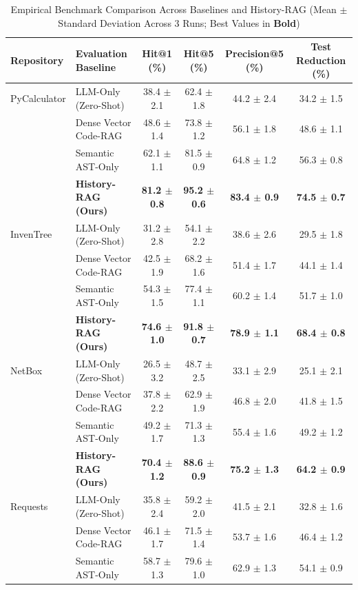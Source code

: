 \documentclass[12pt,onecolumn,draftclsnofoot]{IEEEtran}
\begin{document}
\begin{table}[t]
\centering
\caption{Empirical Benchmark Comparison Across Baselines and History-RAG (Mean $\pm$ Standard Deviation Across 3 Runs; Best Values in \textbf{Bold})}
\label{tab:main_results}
\begin{tabular}{@{}llcccc@{}}
\toprule
\textbf{Repository} & \textbf{Evaluation Baseline} & \textbf{Hit@1 (\%)} & \textbf{Hit@5 (\%)} & \textbf{Precision@5 (\%)} & \textbf{Test Reduction (\%)} \\ \midrule
PyCalculator & LLM-Only (Zero-Shot) & 38.4 $\pm$ 2.1 & 62.4 $\pm$ 1.8 & 44.2 $\pm$ 2.4 & 34.2 $\pm$ 1.5 \\
& Dense Vector Code-RAG & 48.6 $\pm$ 1.4 & 73.8 $\pm$ 1.2 & 56.1 $\pm$ 1.8 & 48.6 $\pm$ 1.1 \\
& Semantic AST-Only & 62.1 $\pm$ 1.1 & 81.5 $\pm$ 0.9 & 64.8 $\pm$ 1.2 & 56.3 $\pm$ 0.8 \\
& \textbf{History-RAG (Ours)} & \textbf{81.2 $\pm$ 0.8} & \textbf{95.2 $\pm$ 0.6} & \textbf{83.4 $\pm$ 0.9} & \textbf{74.5 $\pm$ 0.7} \\ \midrule
InvenTree & LLM-Only (Zero-Shot) & 31.2 $\pm$ 2.8 & 54.1 $\pm$ 2.2 & 38.6 $\pm$ 2.6 & 29.5 $\pm$ 1.8 \\
& Dense Vector Code-RAG & 42.5 $\pm$ 1.9 & 68.2 $\pm$ 1.6 & 51.4 $\pm$ 1.7 & 44.1 $\pm$ 1.4 \\
& Semantic AST-Only & 54.3 $\pm$ 1.5 & 77.4 $\pm$ 1.1 & 60.2 $\pm$ 1.4 & 51.7 $\pm$ 1.0 \\
& \textbf{History-RAG (Ours)} & \textbf{74.6 $\pm$ 1.0} & \textbf{91.8 $\pm$ 0.7} & \textbf{78.9 $\pm$ 1.1} & \textbf{68.4 $\pm$ 0.8} \\ \midrule
NetBox & LLM-Only (Zero-Shot) & 26.5 $\pm$ 3.2 & 48.7 $\pm$ 2.5 & 33.1 $\pm$ 2.9 & 25.1 $\pm$ 2.1 \\
& Dense Vector Code-RAG & 37.8 $\pm$ 2.2 & 62.9 $\pm$ 1.9 & 46.8 $\pm$ 2.0 & 41.8 $\pm$ 1.5 \\
& Semantic AST-Only & 49.2 $\pm$ 1.7 & 71.3 $\pm$ 1.3 & 55.4 $\pm$ 1.6 & 49.2 $\pm$ 1.2 \\
& \textbf{History-RAG (Ours)} & \textbf{70.4 $\pm$ 1.2} & \textbf{88.6 $\pm$ 0.9} & \textbf{75.2 $\pm$ 1.3} & \textbf{64.2 $\pm$ 0.9} \\ \midrule
Requests & LLM-Only (Zero-Shot) & 35.8 $\pm$ 2.4 & 59.2 $\pm$ 2.0 & 41.5 $\pm$ 2.1 & 32.8 $\pm$ 1.6 \\
& Dense Vector Code-RAG & 46.1 $\pm$ 1.7 & 71.5 $\pm$ 1.4 & 53.7 $\pm$ 1.6 & 46.4 $\pm$ 1.2 \\
& Semantic AST-Only & 58.7 $\pm$ 1.3 & 79.6 $\pm$ 1.0 & 62.9 $\pm$ 1.3 & 54.1 $\pm$ 0.9 \\

\end{tabular}
\end{table}
\end{document}
